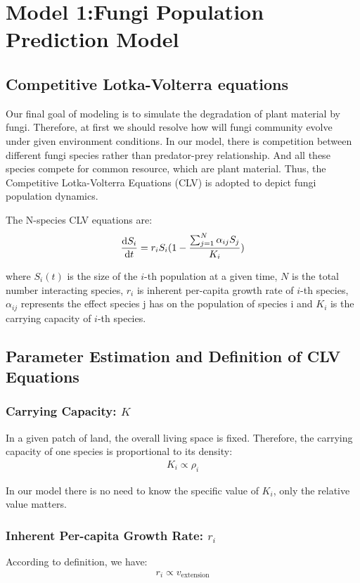 \section{Model 1:Fungi Population Prediction Model}
\subsection{Competitive Lotka-Volterra equations}
	Our final goal of modeling is to simulate the degradation of plant material by fungi. Therefore, at first we should resolve how will fungi community evolve under given environment conditions. In our model, there is competition between different fungi species rather than predator-prey relationship.  And all these species compete for common resource, which are plant material. Thus, the Competitive Lotka-Volterra Equations (CLV) is adopted to depict fungi population dynamics. 

	The N-species CLV equations are: 
	\begin{align}
		\frac{\textrm d S_i}{\textrm d t}=r_iS_i(1-\frac{\sum_{j=1}^N\alpha_{ij}S_j}{K_i})
	\end{align}  

	where $S_i(t)$ is the size of the $i$-th population at a given time, $N$ is the total number interacting species, $r_i$ is inherent per-capita growth rate of $i$-th species, $\alpha_{ij}$ represents the effect species j has on the population of species i and $K_i$ is the carrying capacity of $i$-th species.


 
\subsection{Parameter Estimation and Definition of CLV Equations}
\subsubsection{Carrying Capacity: $K$}
	In a given patch of land,  the overall living space is fixed. Therefore, the carrying capacity of one species is proportional to its density:
	\begin{align}
		K_i \propto \rho_i
	\end{align}

	In our model there is no need to know the specific value of $K_i$, only the relative value matters.
	
\subsubsection{Inherent Per-capita Growth Rate: $r_i$}
	According to definition, we have:
	\begin{align}
		r_i \propto v_{\text{extension}}
	\end{align}
            
